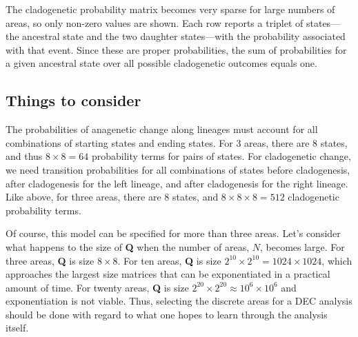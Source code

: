 The cladogenetic probability matrix becomes very sparse for large numbers of areas, so only non-zero values are shown.
Each row reports a triplet of states---the ancestral state and the two daughter states---with the probability associated with that event.
Since these are proper probabilities, the sum of probabilities for a given ancestral state over all possible cladogenetic outcomes equals one.

\subsection{Things to consider}

The probabilities of anagenetic change along lineages must account for all combinations of starting states and ending states.
For 3 areas, there are 8 states, and thus $8 \times 8 = 64$ probability terms for pairs of states.
For cladogenetic change, we need transition probabilities for all combinations of states before cladogenesis, after cladogenesis for the left lineage, and after cladogenesis for the right lineage.
Like above, for three areas, there are 8 states, and $8 \times 8 \times 8 = 512$ cladogenetic probability terms.

Of course, this model can be specified for more than three areas.
Let's consider what happens to the size of \textbf{Q} when the number of areas, $N$, becomes large.
For three areas, \textbf{Q} is size $8 \times 8$.
For ten areas, \textbf{Q} is size $2^{10} \times 2^{10} = 1024 \times 1024$, which approaches the largest size matrices that can be exponentiated in a practical amount of time.
For twenty areas, \textbf{Q} is size $2^{20} \times 2^{20} \approx 10^6 \times 10^6$ and exponentiation is not viable.
Thus, selecting the discrete areas for a DEC analysis should be done with regard to what one hopes to learn through the analysis itself.





